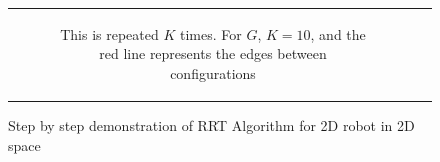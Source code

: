 \begin{figure}[H]
\begin{center}
\begin{tabular}{c c}
\begin{subfigure}{0.45\textwidth}
    \caption{This is repeated $K$ times. For $G$, $K=10$, and the red line represents the edges between \gls{configuration}s}
    \label{subfig:rrt-step-by-step-D}
    \end{subfigure}

\end{tabular}
    
    \caption{Step by step demonstration of \gls{RRT} Algorithm for 2D robot in 2D space}
    \label{fig:rrt-step-by-step}
\end{center}
\end{figure}